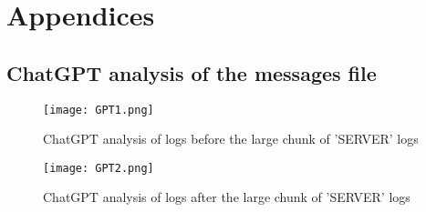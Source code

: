\documentclass[
	letterpaper, %
	10pt, %
	unnumberedsections, %
	twoside, %
]{APAAssignment}
\begin{document}

\appendix


\clearpage
\chapter{Appendices}
\begin{appendices}
\section{ChatGPT analysis of the messages file}\label{app:ChatGPTMessagesAnslysis}	
\begin{figure}[!htp] %
	\centering
	\texttt{[image: GPT1.png]}
	\caption{ChatGPT analysis of logs before the large chunk of 'SERVER' logs}	\label{fig:GPT1.png}
\end{figure}
\begin{figure}[!htp] %
	\centering
	\texttt{[image: GPT2.png]}
	\caption{ChatGPT analysis of logs after the large chunk of 'SERVER' logs}	\label{fig:GPT2.png}
\end{figure}



\end{appendices}
\end{document}
